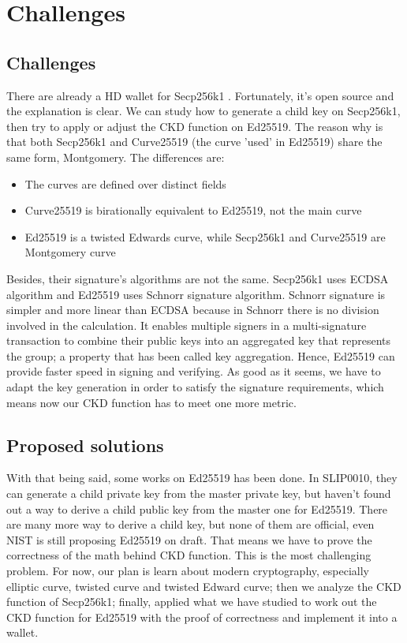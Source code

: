\chapter{Challenges} \label{chap:Challenges}
\minitoc


\section{Challenges}
There are already a HD wallet for Secp256k1 \cite{github/bip0032}. Fortunately, it's open source and the explanation is clear. We can study how to generate a child key on Secp256k1, then try to apply or adjust the CKD function on Ed25519. The reason why is that both Secp256k1 and Curve25519 (the curve 'used' in Ed25519) share the same form, Montgomery. The differences are:

\begin{itemize}
    \item The curves are defined over distinct fields
    \item Curve25519 is birationally equivalent to Ed25519, not the main curve
    \item Ed25519 is a twisted Edwards curve, while Secp256k1 and Curve25519 are \\ Montgomery curve
\end{itemize}

Besides, their signature's algorithms are not the same. Secp256k1 uses ECDSA algorithm and Ed25519 uses Schnorr signature algorithm. Schnorr signature is simpler and more linear than ECDSA because in Schnorr there is no division involved in the calculation\cite*{schnorr}. It enables multiple signers in a multi-signature transaction to combine their public keys into an aggregated key that represents the group; a property that has been called key aggregation. Hence, Ed25519 can provide faster speed in signing and verifying. As good as it seems, we have to adapt the key generation in order to satisfy the signature requirements, which means now our CKD function has to meet one more metric.

\section{Proposed solutions}
With that being said, some works on Ed25519 has been done. In SLIP0010\cite{github/slip0010}, they can generate a child private key from the master private key, but haven't found out a way to derive a child public key from the master one for Ed25519. There are many more way to derive a child key, but none of them are official, even NIST is still proposing Ed25519 on draft\cite{DSS2019}. That means we have to prove the correctness of the math behind CKD function. This is the most challenging problem. For now, our plan is learn about modern cryptography, especially elliptic curve, twisted curve and twisted Edward curve; then we analyze the CKD function of Secp256k1; finally, applied what we have studied to work out the CKD function for Ed25519 with the proof of correctness and implement it into a wallet.
